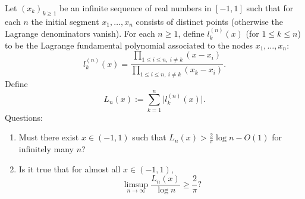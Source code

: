 Let $(x_k)_{k\ge 1}$ be an infinite sequence of real numbers in $[-1,1]$ such that for each $n$ the initial segment $x_1,\dots,x_n$ consists of distinct points (otherwise the Lagrange denominators vanish).
For each $n\ge 1$, define $l_k^{(n)}(x)$ (for $1\le k\le n$) to be the Lagrange fundamental polynomial associated to the nodes $x_1,\dots,x_n$:
\[
 l_k^{(n)}(x)=\frac{\prod_{1\le i\le n,\ i\ne k}(x-x_i)}{\prod_{1\le i\le n,\ i\ne k}(x_k-x_i)}.
\]
Define
\[
L_n(x):=\sum_{k=1}^n \bigl|l_k^{(n)}(x)\bigr|.
\]
Questions:
\begin{enumerate}
\item Must there exist $x\in(-1,1)$ such that $L_n(x) > \tfrac{2}{\pi}\log n - O(1)$ for infinitely many $n$?
\item Is it true that for almost all $x\in(-1,1)$,
\[\limsup_{n\to\infty} \frac{L_n(x)}{\log n}\ge \frac{2}{\pi}?\]
\end{enumerate}
